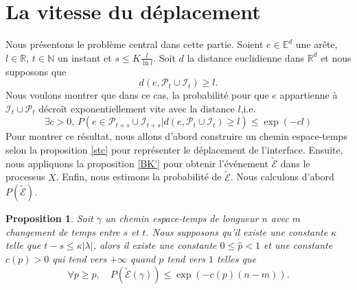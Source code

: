 \documentclass[titlepage,a4paper,12pt]{article}
\newcounter{prop}
\newtheorem{propo}[prop]{Proposition}
\begin{document}
\section{La vitesse du déplacement}
Nous présentons le problème central dans cette partie. Soient $e\in \mathbb{E}^d$ une arête, $l\in \mathbb{R}$, $t\in \mathbb{N}$ un instant et $\displaystyle s\leqslant K\frac{l}{\ln l}$. Soit $d$ la distance euclidienne dans $\mathbb{R}^d$ et nous supposons que $$d(e,\mathcal{P}_t\cup \mathcal{I}_t) \geqslant l.$$ Nous voulons montrer que dans ce cas, la probabilité pour que $e$ appartienne à $\mathcal{I}_t\cup \mathcal{P}_t$ décroît exponentiellement vite avec la distance $l$,i.e. 
\begin{equation}
\exists c > 0,\, P(e\in \mathcal{P}_{t+s}\cup \mathcal{I}_{t+s}|d(e,\mathcal{P}_t\cup \mathcal{I}_t) \geqslant l)\leqslant \exp(-cl)
\end{equation}
Pour montrer ce résultat, nous allons d'abord construire un chemin espace-temps selon la proposition \ref{stc} pour représenter le déplacement de l'interface. Ensuite, nous appliquons la proposition \ref{BK'} pour obtenir l'événement $\tilde{\mathcal{E}}$ dans le processus $X$. Enfin, nous estimons la probabilité de $\tilde{\mathcal{E}}$. Nous calculons d'abord $P(\tilde{\mathcal{E}})$.
\begin{propo} \label{decexp}
Soit $\gamma$ un chemin espace-temps de longueur $n$ avec $m$ changement de temps entre $s$ et $t$. Nous supposons qu'il existe une constante $\kappa$ telle que $t-s \leqslant \kappa |\lambda|$, alors il existe une constante $0\leqslant\hat{p}< 1$ et une constante $c(p)>0$ qui tend vers $+\infty$ quand $p$ tend vers $1$ telles que $$\forall p \geqslant \hat{p}, \quad P(\tilde{\mathcal{E}}(\gamma))\leqslant \exp(-c(p)(n-m)).$$
\end{propo}
\end{document}

